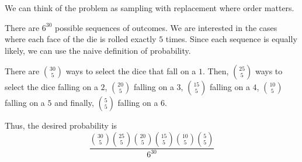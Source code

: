 We can think of the problem as sampling with replacement where order matters.

There are $6^{30}$ possible sequences of outcomes. We are interested in the cases 
where each face of the die is rolled exactly $5$ times. Since each sequence is 
equally likely, we can use the naive definition of probability.

There are $\binom{30}{5}$ ways to select the dice that fall on a $1$. Then, 
$\binom{25}{5}$ ways to select the dice falling on a $2$, $\binom{20}{5}$ 
falling on a $3$, $\binom{15}{5}$ falling on a $4$, $\binom{10}{5}$ falling 
on a $5$ and finally, $\binom{5}{5}$ falling on a $6$.

Thus, the desired probability is $$\frac{\binom{30}{5} \binom{25}{5} 
\binom{20}{5} \binom{15}{5} \binom{10}{5} \binom{5}{5}}{6^{30}}$$ 
